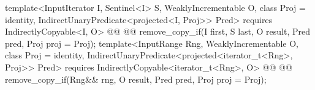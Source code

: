 \begin{addedblock}
\begin{codeblock}
{    template<InputIterator I, Sentinel<I> S, WeaklyIncrementable O,
        class Proj = identity, IndirectUnaryPredicate<projected<I, Proj>> Pred>
      requires IndirectlyCopyable<I, O>
      @@
      @@
        remove_copy_if(I first, S last, O result, Pred pred, Proj proj = Proj{});
    template<InputRange Rng, WeaklyIncrementable O, class Proj = identity,
        IndirectUnaryPredicate<projected<iterator_t<Rng>, Proj>> Pred>
      requires IndirectlyCopyable<iterator_t<Rng>, O>
      @@
      @@
        remove_copy_if(Rng&& rng, O result, Pred pred, Proj proj = Proj{});
  }
\end{codeblock}\end{addedblock}\begin{codeblock}


\end{codeblock}
